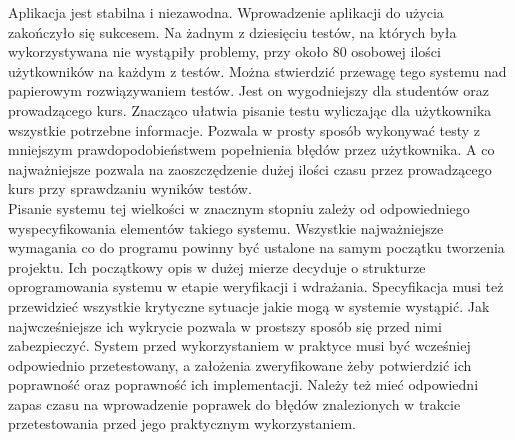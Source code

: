 \documentclass[eng]{mgr}
\begin{document}
	Aplikacja jest stabilna i niezawodna. Wprowadzenie aplikacji do użycia zakończyło się sukcesem. Na żadnym z dziesięciu testów, na których była wykorzystywana nie wystąpiły problemy, przy około 80 osobowej ilości użytkowników na każdym z testów. Można stwierdzić przewagę tego systemu nad papierowym rozwiązywaniem testów. Jest on wygodniejszy dla studentów oraz prowadzącego kurs. Znacząco ułatwia pisanie testu wyliczając dla użytkownika wszystkie potrzebne informacje. Pozwala w prosty sposób wykonywać testy z mniejszym prawdopodobieństwem popełnienia błędów przez użytkownika. A co najważniejsze pozwala na zaoszczędzenie dużej ilości czasu przez prowadzącego kurs przy sprawdzaniu wyników testów.\\
	
	Pisanie systemu tej wielkości w znacznym stopniu zależy od odpowiedniego wyspecyfikowania elementów takiego systemu. Wszystkie najważniejsze wymagania co do programu powinny być ustalone na samym początku tworzenia projektu. Ich początkowy opis w dużej mierze decyduje o strukturze oprogramowania systemu w etapie weryfikacji i wdrażania.  Specyfikacja musi też przewidzieć wszystkie krytyczne sytuacje jakie mogą w systemie wystąpić. Jak najwcześniejsze ich wykrycie pozwala w prostszy sposób się przed nimi zabezpieczyć. System przed wykorzystaniem w praktyce musi być wcześniej odpowiednio przetestowany, a założenia zweryfikowane żeby potwierdzić ich poprawność oraz poprawność ich implementacji. Należy też mieć odpowiedni zapas czasu na wprowadzenie poprawek do błędów znalezionych w trakcie przetestowania przed jego praktycznym wykorzystaniem.
			
	
	
			
\end{document}
